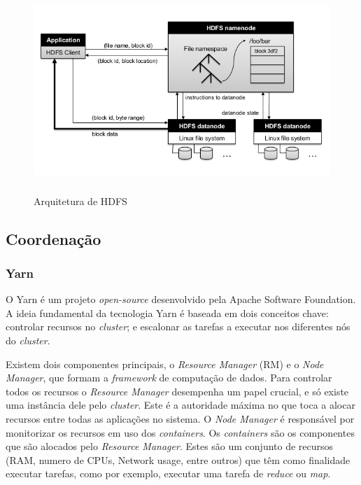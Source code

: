 \begin{figure}[htbp]
	\centering
	\includegraphics[height=3in]{LaTeX/Chapters/Figures/HDFS.png}
    
  \caption{Arquitetura de HDFS}
  \label{fig:figura-completa}
\end{figure}

\subsection{Coordenação}

\subsubsection{Yarn}
O Yarn \cite{yarn} é um projeto \textit{open-source} desenvolvido pela Apache Software Foundation. A ideia fundamental da tecnologia Yarn é baseada em dois conceitos chave: controlar recursos no \textit{cluster}; e escalonar as tarefas a executar nos diferentes nós do \textit{cluster}.

Existem dois componentes principais, o \textit{Resource Manager} (RM) e o \textit{Node Manager}, que formam a \textit{framework} de computação de dados.
Para controlar todos os recursos o \textit{Resource Manager} desempenha um papel crucial, e só existe uma instância dele pelo \textit{cluster}. Este é a autoridade máxima no que toca a alocar recursos entre todas as aplicações no sistema. O \textit{Node Manager} é responsável por monitorizar os recursos em uso dos \textit{containers}. Os \textit{containers} são os componentes que são alocados pelo \textit{Resource Manager}. Estes são um conjunto de recursos (RAM, numero de CPUs, Network usage, entre outros) que têm como finalidade executar tarefas, como por exemplo, executar uma tarefa de \textit{reduce} ou \textit{map}.

